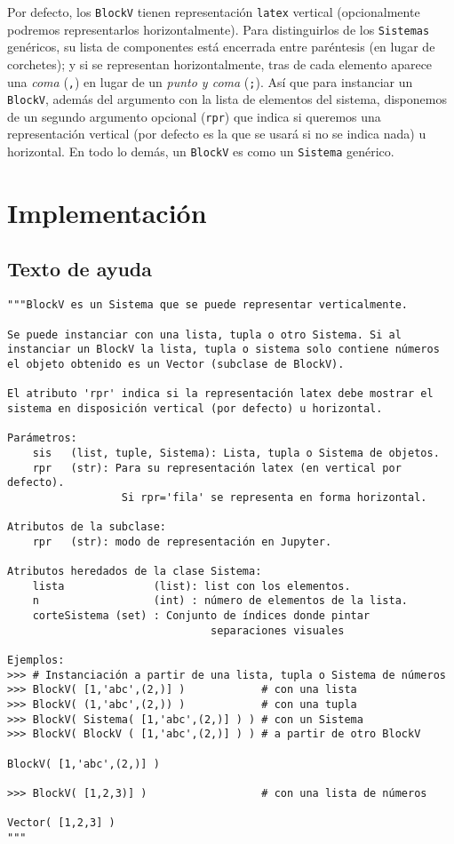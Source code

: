 \documentclass[11pt]{report}
\begin{document}
Por defecto, los \texttt{BlockV} tienen representación \texttt{latex} vertical
(opcionalmente podremos representarlos horizontalmente). Para
distinguirlos de los \texttt{Sistemas} genéricos, su lista de componentes
está encerrada entre paréntesis (en lugar de corchetes); y si se
representan horizontalmente, tras de cada elemento aparece una \emph{coma}
(\texttt{,}) en lugar de un \emph{punto y coma} (\texttt{;}). Así que para instanciar un
\texttt{BlockV}, además del argumento con la lista de elementos del sistema,
disponemos de un segundo argumento opcional (\texttt{rpr}) que indica si
queremos una representación vertical (por defecto es la que se usará
si no se indica nada) u horizontal. En todo lo demás, un \texttt{BlockV} es
como un \texttt{Sistema} genérico.

\section{Implementación}
\label{sec:org5e3ee7d}

\subsection{Texto de ayuda}
\label{sec:orgfe17bb1}

\begin{verbatim}
"""BlockV es un Sistema que se puede representar verticalmente.

Se puede instanciar con una lista, tupla o otro Sistema. Si al
instanciar un BlockV la lista, tupla o sistema solo contiene números
el objeto obtenido es un Vector (subclase de BlockV).

El atributo 'rpr' indica si la representación latex debe mostrar el
sistema en disposición vertical (por defecto) u horizontal.

Parámetros:
    sis   (list, tuple, Sistema): Lista, tupla o Sistema de objetos.
    rpr   (str): Para su representación latex (en vertical por defecto).
                  Si rpr='fila' se representa en forma horizontal. 

Atributos de la subclase:
    rpr   (str): modo de representación en Jupyter.

Atributos heredados de la clase Sistema:
    lista              (list): list con los elementos.
    n                  (int) : número de elementos de la lista.
    corteSistema (set) : Conjunto de índices donde pintar
                                separaciones visuales

Ejemplos:
>>> # Instanciación a partir de una lista, tupla o Sistema de números
>>> BlockV( [1,'abc',(2,)] )            # con una lista
>>> BlockV( (1,'abc',(2,)) )            # con una tupla
>>> BlockV( Sistema( [1,'abc',(2,)] ) ) # con un Sistema
>>> BlockV( BlockV ( [1,'abc',(2,)] ) ) # a partir de otro BlockV

BlockV( [1,'abc',(2,)] )

>>> BlockV( [1,2,3)] )                  # con una lista de números

Vector( [1,2,3] )
"""
\end{verbatim}
\end{document}

